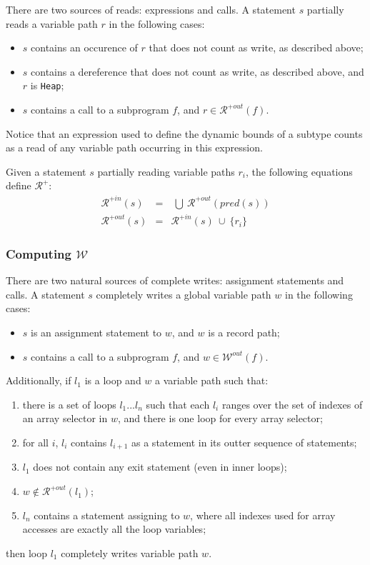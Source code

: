 \documentclass{article}
\newcommand{\code}[1]{\texttt{#1}}
\newcommand{\heap}{\code{Heap}\xspace}
\newcommand{\pred}[1]{\ensuremath{\mathit{pred}(#1)}\xspace}
\newcommand{\writes}{$\mathcal{W}$\xspace}
\newcommand{\outwrites}[1]{\ensuremath{\mathcal{W}^{out}(#1)}\xspace}
\newcommand{\allreads}{$\mathcal{R^+}$\xspace}
\newcommand{\inallreads}[1]{\ensuremath{\mathcal{R}^{+in}(#1)}\xspace}
\newcommand{\outallreads}[1]{\ensuremath{\mathcal{R}^{+out}(#1)}\xspace}
\newcommand{\union}{~\cup~}
\newcommand{\bigunion}{~\bigcup~}
\begin{document}
There are two sources of reads: expressions and calls. A statement $s$
partially reads a variable path $r$ in the following cases:
\begin{itemize}
\item $s$ contains an occurence of $r$ that does not count as write, as
  described above;
\item $s$ contains a dereference that does not count as write, as described
  above, and $r$ is \heap;
\item $s$ contains a call to a subprogram $f$, and $r \in \outallreads{f}$.
\end{itemize}

Notice that an expression used to define the dynamic bounds of a subtype counts
as a read of any variable path occurring in this expression.

Given a statement $s$ partially reading variable paths $r_i$, the following
equations define \allreads:
\begin{eqnarray*}
\inallreads{s} &=& \bigunion \outallreads{\pred{s}}\\
\outallreads{s} &=& \inallreads{s} \union \{r_i\}
\end{eqnarray*}

\subsubsection{Computing \writes}

There are two natural sources of complete writes: assignment statements and
calls. A statement $s$ completely writes a global variable path $w$ in the
following cases:
\begin{itemize}
\item $s$ is an assignment statement to $w$, and $w$ is a record path;
\item $s$ contains a call to a subprogram $f$, and $w \in \outwrites{f}$.
\end{itemize}
Additionally, if $l_1$ is a loop and $w$ a variable path such that:
\begin{enumerate}
\item there is a set of loops $l_1...l_n$ such that each $l_i$ ranges over the
  set of indexes of an array selector in $w$, and there is one loop for every
  array selector;
\item for all $i$, $l_i$ contains
  $l_{i+1}$ as a statement in its outter sequence of statements;
\item $l_1$ does not contain any exit statement (even in inner loops);
\item $w \notin \outallreads{l_1}$;
\item $l_n$ contains a statement assigning to $w$, where all indexes used for
  array accesses are exactly all the loop variables;
\end{enumerate}
then loop $l_1$ completely writes variable path $w$.
\end{document}
